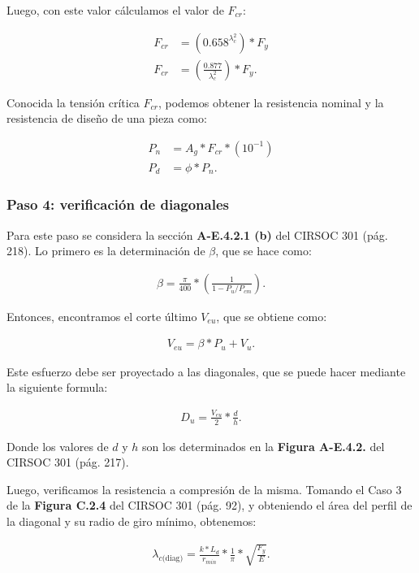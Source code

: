 \documentclass[../main.tex]{subfiles}
\begin{document}
Luego, con este valor cálculamos el valor de $F_{cr}$:

\begin{align*}
  F_{cr} &= \left( 0.658^{\lambda_c^2} \right)*F_y \tag{$\lambda_c \leq 1.5$}  \\[5pt]
  F_{cr} &= \left( \frac{0.877}{\lambda_c^2} \right) * F_y \tag{$\lambda_c \geq 1.5$}
.\end{align*}

Conocida la tensión crítica $F_{cr}$, podemos obtener la resistencia nominal y 
la resistencia de diseño de una pieza como:

\begin{align*}
  P_{n} &= A_g * F_{cr} * (10^{-1}) \\[5pt]
  P_{d} &= \phi * P_n
.\end{align*}

\subsubsection{Paso 4: verificación de diagonales}

Para este paso se considera la sección \textbf{A-E.4.2.1 (b)} del CIRSOC 301 
(pág. 218). Lo primero es la determinación de $\beta$, que se hace como:

\begin{align*}
  \beta = \frac{\pi}{400} * \left( \frac{1}{1-P_u / P_{cm}} \right) 
.\end{align*}

Entonces, encontramos el corte último $V_{eu}$, que se obtiene como:

\begin{align*}
  V_{eu} = \beta * P_u + V_u
.\end{align*}

Este esfuerzo debe ser proyectado a las diagonales, que se puede hacer mediante
la siguiente formula:

\begin{align*}
  D_u = \frac{V_{eu}}{2} * \frac{d}{h}
.\end{align*}

Donde los valores de $d$ y $h$ son los determinados en la 
\textbf{Figura A-E.4.2.} del CIRSOC 301 (pág. 217).

Luego, verificamos la resistencia a compresión de la misma. Tomando el Caso 3 de
la \textbf{Figura C.2.4} del CIRSOC 301 (pág. 92), y obteniendo el área del 
perfil de la diagonal y su radio de giro mínimo, obtenemos:

\begin{align*}
\lambda_{c\text{(diag)}} = \frac{k*L_d}{r_{min}} * \frac{1}{\pi} * \sqrt{\frac{F_y}{E}} 
.\end{align*}
\end{document}
